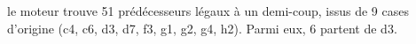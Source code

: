le moteur trouve 51 prédécesseurs légaux à un demi-coup, issus de 9 cases d'origine (c4, c6, d3, d7, f3, g1, g2, g4, h2). Parmi eux, 6 partent de d3.
